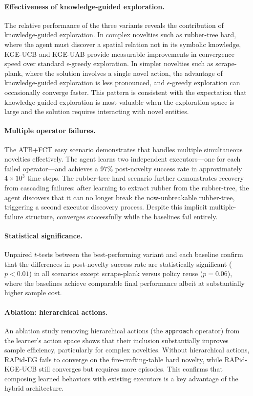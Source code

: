 \paragraph{Effectiveness of knowledge-guided exploration.} The relative performance of the three \RAPidLearn{} variants reveals the contribution of knowledge-guided exploration. In complex novelties such as rubber-tree hard, where the agent must discover a spatial relation not in its symbolic knowledge, KGE-UCB and KGE-UAB provide measurable improvements in convergence speed over standard $\epsilon$-greedy exploration. In simpler novelties such as scrape-plank, where the solution involves a single novel action, the advantage of knowledge-guided exploration is less pronounced, and $\epsilon$-greedy exploration can occasionally converge faster. This pattern is consistent with the expectation that knowledge-guided exploration is most valuable when the exploration space is large and the solution requires interacting with novel entities.

\paragraph{Multiple operator failures.} The ATB+FCT easy scenario demonstrates that \RAPidLearn{} handles multiple simultaneous novelties effectively. The agent learns two independent executors---one for each failed operator---and achieves a 97\% post-novelty success rate in approximately $4 \times 10^3$ time steps. The rubber-tree hard scenario further demonstrates recovery from cascading failures: after learning to extract rubber from the rubber-tree, the agent discovers that it can no longer break the now-unbreakable rubber-tree, triggering a second executor discovery process. Despite this implicit multiple-failure structure, \RAPidLearn{} converges successfully while the baselines fail entirely.

\paragraph{Statistical significance.} Unpaired $t$-tests between the best-performing \RAPidLearn{} variant and each baseline confirm that the differences in post-novelty success rate are statistically significant ($p < 0.01$) in all scenarios except scrape-plank versus policy reuse ($p = 0.06$), where the baselines achieve comparable final performance albeit at substantially higher sample cost.

\paragraph{Ablation: hierarchical actions.} An ablation study removing hierarchical actions (the \texttt{approach} operator) from the learner's action space shows that their inclusion substantially improves sample efficiency, particularly for complex novelties. Without hierarchical actions, RAPid-EG fails to converge on the fire-crafting-table hard novelty, while RAPid-KGE-UCB still converges but requires more episodes. This confirms that composing learned behaviors with existing executors is a key advantage of the hybrid architecture.


